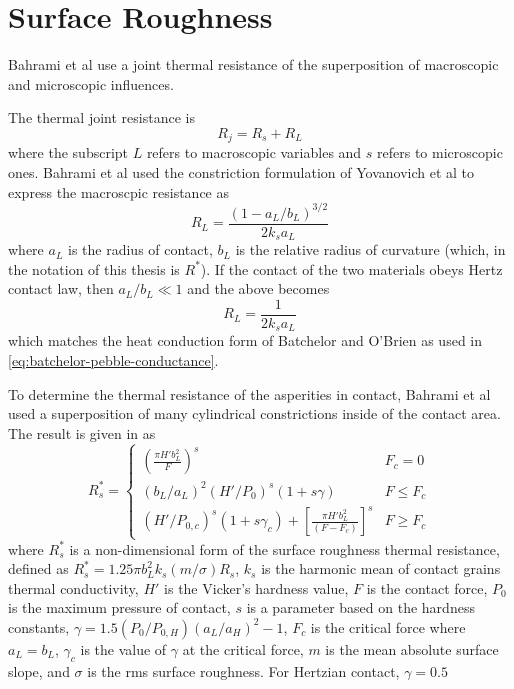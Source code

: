 \chapter{Surface Roughness}
Bahrami et al use a joint thermal resistance of the superposition of macroscopic and microscopic influences.\cite{Bahrami2004}

The thermal joint resistance is
\begin{equation}
	R_j = R_s + R_L
\end{equation}
where the subscript $L$ refers to macroscopic variables and $s$ refers to microscopic ones. Bahrami et al used the constriction formulation of Yovanovich et al to express the macroscpic resistance as\cite{Yovanovich1976}
\begin{equation}
	R_L = \frac{(1-a_L/b_L)^{3/2}}{2k_sa_L}
\end{equation}
where $a_L$ is the radius of contact, $b_L$ is the relative radius of curvature (which, in the notation of this thesis is $R^*$). If the contact of the two materials obeys Hertz contact law, then $a_L/b_L \ll 1$ and the above becomes
\begin{equation}\label{eq:macro-thermal-resistance}
	R_L = \frac{1}{2k_sa_L}
\end{equation}
which matches the heat conduction form of Batchelor and O'Brien\cite{Batchelor1977} as used in \cref{eq:batchelor-pebble-conductance}.

To determine the thermal resistance of the asperities in contact, Bahrami et al used a superposition of many cylindrical constrictions inside of the contact area. The result is given in \cite{Bahrami2004} as
\begin{equation}
	R_s^* = \begin{cases}
	\left(\frac{\pi H'b_L^2}{F} \right)^s 										& F_c = 0\\
	(b_L/a_L)^2(H'/P_0)^s(1+s\gamma) 										& F \le F_c\\
	(H'/P_{0,c})^s(1+s\gamma_c)+\left[\frac{\pi H'b_L^2}{(F-F_c)}\right]^s				& F\ge F_c
	\end{cases}
\end{equation}
where $R_s^*$ is a non-dimensional form of the surface roughness thermal resistance, defined as $R_s^* = 1.25\pi b_L^2k_s(m/\sigma)R_s$, $k_s$ is the harmonic mean of contact grains thermal conductivity, $H'$ is the Vicker's hardness value, $F$ is the contact force, $P_0$ is the maximum pressure of contact, $s$ is a parameter based on the hardness constants, $\gamma = 1.5(P_0/P_{0,H})(a_L/a_H)^2-1$, $F_c$ is the critical force where $a_L = b_L$, $\gamma_c$ is the value of $\gamma$ at the critical force, $m$ is the mean absolute surface slope, and $\sigma$ is the rms surface roughness. For Hertzian contact, $\gamma = 0.5$

